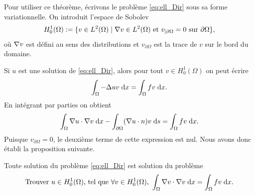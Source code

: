 \documentclass[12pt,a4paper,twoside]{article}
\begin{document}

Pour utiliser ce th\'eor\`eme, \'ecrivons le probl\`eme \eqref{eq:ell_Dir} sous
sa forme variationnelle.
On introduit l'espace de Sobolev
\begin{align}
  H_0^1(\Omega) := \{ v \in L^2(\Omega) \; | \; \nabla v \in L^2(\Omega) 
  \text{ et } v_{| \partial \Omega} = 0 \text{ sur } \partial \Omega \} ,
\end{align}
o\`u $\nabla v$ est d\'efini au sens des distributions et $v_{\partial \Omega}$
est la trace de $v$ sur le bord du domaine.


Si $u$ est une solution de \eqref{eq:ell_Dir}, alors pour tout $v \in H^1_0(\Omega)$
on peut \'ecrire
\begin{align*}
  \int_{\Omega} - \Delta u v \;\mathrm{d} x = \int_{\Omega} f v \;\mathrm{d} x .
\end{align*}
En int\'egrant par parties on obtient 
\begin{align*}
  \int_{\Omega} \nabla u \cdot \nabla v \;\mathrm{d} x 
  - \int_{\partial \Omega} (\nabla u \cdot n) v \;\mathrm{d} s = \int_{\Omega} f v \;\mathrm{d} x .
\end{align*}
Puisque $v_{\partial \Omega} = 0$, le deuxi\`eme terme de cette expression est nul.
Nous avons donc \'etabli la proposition suivante.
\begin{proposition}
  Toute solution du probl\`eme \eqref{eq:ell_Dir} est solution du probl\`eme 
  \begin{equation}
    \label{eq:LM2}
    \text{Trouver $u \in H_0^1(\Omega)$, tel que $\forall v \in H_0^1(\Omega)$, } 
    \int_{\Omega} \nabla v \cdot \nabla v \;\mathrm{d} x = \int_{\Omega} f v \;\mathrm{d} x .
  \end{equation}
\end{proposition}
\end{document}
